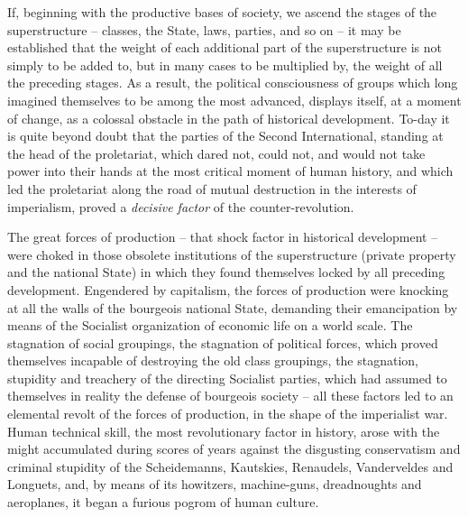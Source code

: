 \documentclass[12pt]{article}
\begin{document}
\vspace{12pt}
If, beginning with the productive bases of society, we ascend the
stages of the superstructure -- classes, the State, laws, parties, and
so on -- it may be established that the weight of each additional part
of the superstructure is not simply to be added to, but in many cases
to be multiplied by, the weight of all the preceding stages. As a
result, the political consciousness of groups which long imagined
themselves to be among the most advanced, displays itself, at a moment
of change, as a colossal obstacle in the path of historical
development. To-day it is quite beyond doubt that the parties of the
Second International, standing at the head of the proletariat, which
dared not, could not, and would not take power into their hands at the
most critical moment of human history, and which led the proletariat
along the road of mutual destruction in the interests of imperialism,
proved a \emph{decisive factor} of the counter-revolution.

\vspace{12pt}
The great forces of production -- that shock factor in historical
development -- were choked in those obsolete institutions of the
superstructure (private property and the national State) in which they
found themselves locked by all preceding development. Engendered by
capitalism, the forces of production were knocking at all the walls of
the bourgeois national State, demanding their emancipation by means of
the Socialist organization of economic life on a world scale. The
stagnation of social groupings, the stagnation of political forces,
which proved themselves incapable of destroying the old class
groupings, the stagnation, stupidity and treachery of the directing
Socialist parties, which had assumed to themselves in reality the
defense of bourgeois society -- all these factors led to an elemental
revolt of the forces of production, in the shape of the imperialist
war. Human technical skill, the most revolutionary factor in history,
arose with the might accumulated during scores of years against the
disgusting conservatism and criminal stupidity of the Scheidemanns,
Kautskies, Renaudels, Vanderveldes and Longuets, and, by means of its
howitzers, machine-guns, dreadnoughts and aeroplanes, it began a
furious pogrom of human culture.
\end{document}
